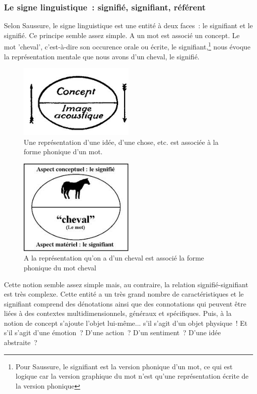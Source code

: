 \documentclass[a4paper,11pt,french]{article}
\begin{document}
\subsubsection{Le signe linguistique~: signifié, signifiant, référent}

Selon Saussure, le signe linguistique est une entité à deux faces~: le signifiant et le signifié. Ce principe semble assez simple. A un mot est associé un concept. Le mot 'cheval', c'est-à-dire son occurence orale ou écrite, le signifiant,\footnote{Pour Saussure, le signifiant est la version phonique d'un mot, ce qui est logique car la version graphique du mot n'est qu'une représentation écrite de la version phonique} nous évoque la représentation mentale que nous avons d'un cheval, le signifié. 


\begin{figure}[h!]
  \centering
      \includegraphics[width=0.5\textwidth]{img/signe-conceptimageacoustique.jpeg}
  \caption{Une représentation d'une idée, d'une chose, etc. est associée à la forme phonique d'un mot.}
\end{figure}

\begin{figure}[h!]
  \centering
      \includegraphics[width=0.5\textwidth]{img/signe-cheval.jpeg}
  \caption{A la représentation qu'on a d'un cheval est associé la forme phonique du mot cheval}
\end{figure}

Cette notion semble assez simple mais, au contraire, la relation signifié-signifiant est très complexe. Cette entité a un très grand nombre de caractéristiques et le signifiant comprend des dénotations ainsi que des connotations qui peuvent être liées à des contextes multidimensionnels, généraux et spécifiques. Puis, à la notion de concept s'ajoute l'objet lui-même... s'il s'agit d'un objet physique~! Et s'il s'agit d'une émotion~? D'une action~? D'un sentiment~? D'une idée abstraite~? 
\end{document}
